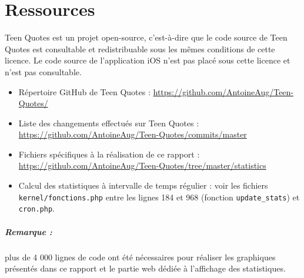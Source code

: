\documentclass{report}
\begin{document}
	\chapter{Ressources}
	Teen Quotes est un projet open-source, c'est-à-dire que le code source de Teen Quotes est consultable et redistribuable sous les mêmes conditions de cette licence. Le code source de l'application iOS n'est pas placé sous cette licence et n'est pas consultable.\\

	\begin{itemize}
		\item Répertoire GitHub de Teen Quotes : \url{https://github.com/AntoineAug/Teen-Quotes/}
		\item Liste des changements effectués sur Teen Quotes : \url{https://github.com/AntoineAug/Teen-Quotes/commits/master}
		\item Fichiers spécifiques à la réalisation de ce rapport : \url{https://github.com/AntoineAug/Teen-Quotes/tree/master/statistics}
		\item Calcul des statistiques à intervalle de temps régulier : voir les fichiers \texttt{kernel/fonctions.php} entre les lignes 184 et 968 (fonction \texttt{update\_stats}) et \texttt{cron.php}.
	\end{itemize}

	\paragraph{Remarque :} plus de 4 000 lignes de code ont été nécessaires pour réaliser les graphiques présentés dans ce rapport et le partie web dédiée à l'affichage des statistiques. 

\end{document}
